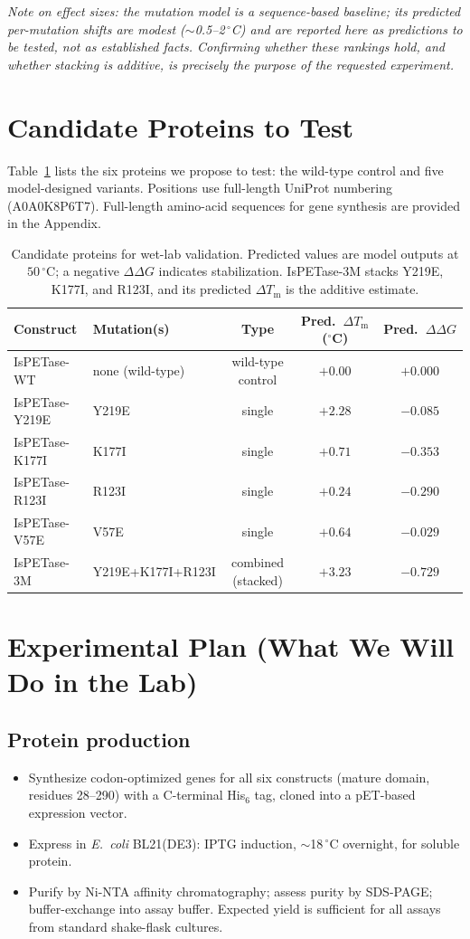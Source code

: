 \documentclass[11pt]{article}
\begin{document}
\emph{Note on effect sizes: the mutation model is a sequence-based baseline; its predicted
per-mutation shifts are modest ($\sim$0.5--2$\,^{\circ}$C) and are reported here as predictions
to be tested, not as established facts. Confirming whether these rankings hold, and whether
stacking is additive, is precisely the purpose of the requested experiment.}

\section{Candidate Proteins to Test}
Table~\ref{tab:candidates} lists the six proteins we propose to test: the wild-type control
and five model-designed variants. Positions use full-length UniProt numbering (A0A0K8P6T7).
Full-length amino-acid sequences for gene synthesis are provided in the Appendix.

\begin{table}[ht]
\centering
\caption{Candidate proteins for wet-lab validation. Predicted values are model outputs at
$50\,^{\circ}$C; a negative $\Delta\Delta G$ indicates stabilization. IsPETase-3M stacks
Y219E, K177I, and R123I, and its predicted $\Delta T_\mathrm{m}$ is the additive estimate.}
\label{tab:candidates}
\begin{tabular}{llccc}
\toprule
Construct & Mutation(s) & Type & Pred.\ $\Delta T_\mathrm{m}$ ($^{\circ}$C) & Pred.\ $\Delta\Delta G$ \\
\midrule
IsPETase-WT & none (wild-type) & wild-type control & $+0.00$ & $+0.000$ \\
IsPETase-Y219E & Y219E & single & $+2.28$ & $-0.085$ \\
IsPETase-K177I & K177I & single & $+0.71$ & $-0.353$ \\
IsPETase-R123I & R123I & single & $+0.24$ & $-0.290$ \\
IsPETase-V57E & V57E & single & $+0.64$ & $-0.029$ \\
IsPETase-3M & Y219E+K177I+R123I & combined (stacked) & $+3.23$ & $-0.729$ \\
\bottomrule
\end{tabular}
\end{table}

\section{Experimental Plan (What We Will Do in the Lab)}
\subsection{Protein production}
\begin{itemize}
\item Synthesize codon-optimized genes for all six constructs (mature domain, residues
28--290) with a C-terminal His$_6$ tag, cloned into a pET-based expression vector.
\item Express in \emph{E.\ coli} BL21(DE3): IPTG induction, $\sim$18$\,^{\circ}$C overnight,
for soluble protein.
\item Purify by Ni-NTA affinity chromatography; assess purity by SDS-PAGE; buffer-exchange
into assay buffer. Expected yield is sufficient for all assays from standard shake-flask
cultures.
\end{itemize}
\end{document}

